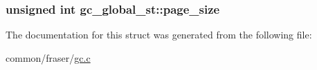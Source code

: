 \hypertarget{structgc__global__st_ad2d5c64649acda3f422f0fb547553b9c}{
\subsubsection[{page\-\_\-size}]{\setlength{\rightskip}{0pt plus 5cm}unsigned int gc\-\_\-global\-\_\-st\-::page\-\_\-size}}\label{structgc__global__st_ad2d5c64649acda3f422f0fb547553b9c}


The documentation for this struct was generated from the following file\-:\begin{DoxyCompactItemize}
\item 
common/fraser/\hyperlink{gc_8c}{gc.\-c}\end{DoxyCompactItemize}
